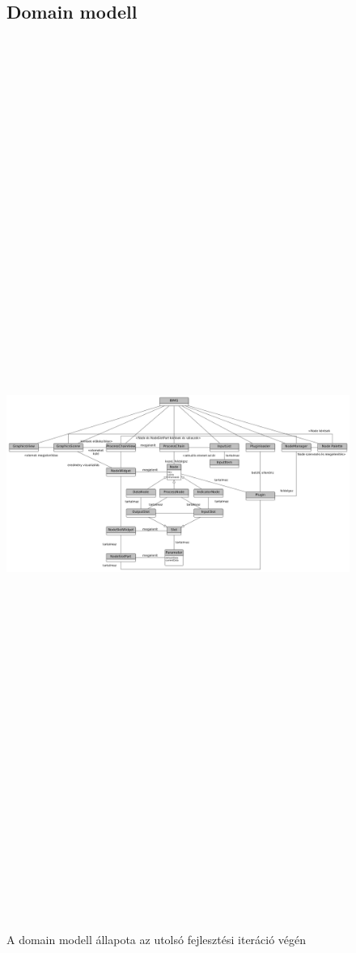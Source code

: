 \documentclass[a4paper,12pt,oneside]{report}
\begin{document}
\begin{landscape}
\begin{figure}[h]
  \subsection{Domain modell}
  \includegraphics[width=26cm,height=30cm,keepaspectratio]{domain_gray.png}
  \caption{A domain modell állapota az utolsó fejlesztési iteráció végén }

  \label{fig:bimg_domain_img}
\end{figure}
\end{landscape}
\end{document}
